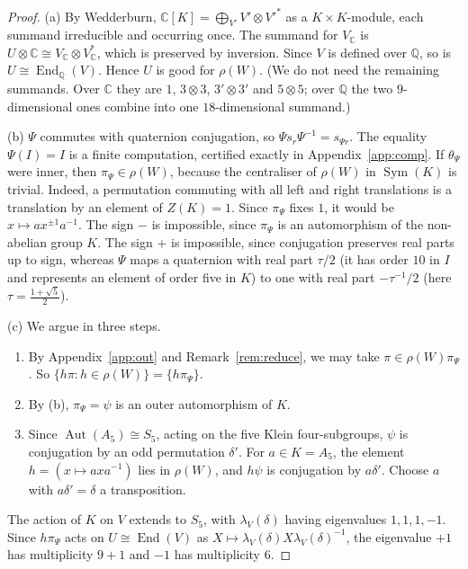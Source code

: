 \documentclass[11pt]{amsart}
\theoremstyle{definition}
\newcommand{\Q}{\mathbb{Q}}
\newcommand{\C}{\mathbb{C}}
\newcommand{\Aut}{\operatorname{Aut}}
\newcommand{\End}{\operatorname{End}}
\newcommand{\Sym}{\operatorname{Sym}}
\begin{document}
\begin{proof}
(a) By Wedderburn, $\C[K]=\bigoplus_{V'}V'\otimes V'^*$ as a $K\times K$-module, each summand irreducible and
occurring once. The summand for $V_\C$ is $U\otimes\C\cong V_\C\otimes V_\C^*$, which is preserved by inversion. Since
$V$ is defined over $\Q$, so is $U\cong\End_\Q(V)$. Hence $U$ is good for $\rho(W)$. (We do not need the remaining
summands. Over $\C$ they are $1$, $3\otimes3$, $3'\otimes3'$ and $5\otimes5$; over $\Q$ the two $9$-dimensional
ones combine into one $18$-dimensional summand.)

(b) $\Psi$ commutes with quaternion conjugation, so $\Psi s_r\Psi^{-1}=s_{\Psi r}$. The equality $\Psi(I)=I$ is a
finite computation, certified exactly in Appendix~\ref{app:comp}. If $\theta_\Psi$ were inner, then
$\pi_\Psi\in\rho(W)$, because the centraliser of $\rho(W)$ in $\Sym(K)$ is trivial. Indeed, a permutation commuting
with all left and right translations is a translation by an element of $Z(K)=1$. Since $\pi_\Psi$ fixes $1$, it would be $x\mapsto ax^{\pm1}a^{-1}$. The sign $-$ is impossible, since $\pi_\Psi$ is an
automorphism of the non-abelian group $K$. The sign $+$ is impossible, since conjugation preserves real parts up to
sign, whereas $\Psi$ maps a quaternion with real part $\tau/2$ (it has order $10$ in $I$ and represents an element of
order five in $K$) to one with real part $-\tau^{-1}/2$ (here $\tau=\frac{1+\sqrt5}2$).

(c) We argue in three steps.
\begin{enumerate}[label=(\roman*)]
\item By Appendix~\ref{app:out} and Remark~\ref{rem:reduce}, we may take $\pi\in\rho(W)\pi_\Psi$. So $\{h\pi:h\in\rho(W)\}=\{h\pi_\Psi\}$.
\item By (b), $\pi_\Psi=\psi$ is an outer automorphism of $K$.
\item Since $\Aut(A_5)\cong S_5$, acting on the five Klein four-subgroups, $\psi$ is conjugation by an odd
permutation $\delta'$. For $a\in K=A_5$, the element $h=(x\mapsto axa^{-1})$ lies in $\rho(W)$, and $h\psi$ is
conjugation by $a\delta'$. Choose $a$ with $a\delta'=\delta$ a transposition.
\end{enumerate}
The action of $K$ on $V$ extends to $S_5$, with $\lambda_V(\delta)$ having eigenvalues $1,1,1,-1$. Since
$h\pi_\Psi$ acts on $U\cong\End(V)$ as $X\mapsto\lambda_V(\delta)X\lambda_V(\delta)^{-1}$, the eigenvalue $+1$ has
multiplicity $9+1$ and $-1$ has multiplicity $6$.
\end{proof}
\end{document}
